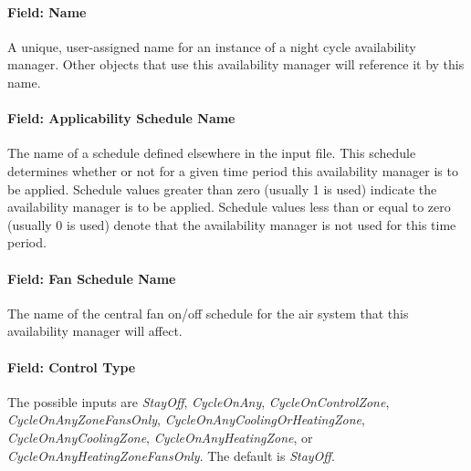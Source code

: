 \paragraph{Field: Name}\label{field-name-2-030}

A unique, user-assigned name for an instance of a night cycle availability manager. Other objects that use this availability manager will reference it by this name.

\paragraph{Field: Applicability Schedule Name}\label{field-applicability-schedule-name}

The name of a schedule defined elsewhere in the input file. This schedule determines whether or not for a given time period this availability manager is to be applied. Schedule values greater than zero (usually 1 is used) indicate the availability manager is to be applied. Schedule values less than or equal to zero (usually 0 is used) denote that the availability manager is not used for this time period.

\paragraph{Field: Fan Schedule Name}\label{field-fan-schedule-name}

The name of the central fan on/off schedule for the air system that this availability manager will affect.

\paragraph{Field: Control Type}\label{field-control-type}

The possible inputs are \emph{StayOff}, \emph{CycleOnAny}, \emph{CycleOnControlZone}, \emph{CycleOnAnyZoneFansOnly}, \emph{CycleOnAnyCoolingOrHeatingZone}, \emph{CycleOnAnyCoolingZone}, \emph{CycleOnAnyHeatingZone}, or \emph{CycleOnAnyHeatingZoneFansOnly}. The default is \emph{StayOff}.


